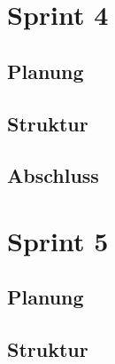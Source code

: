 \documentclass{my_Presentation}
\begin{document}
\section{Sprint 4}
\subsection*{Planung}

\subsection*{Struktur}

\subsection*{Abschluss}



%
%


\section{Sprint 5}
\subsection*{Planung}

\subsection*{Struktur}


\end{document}
